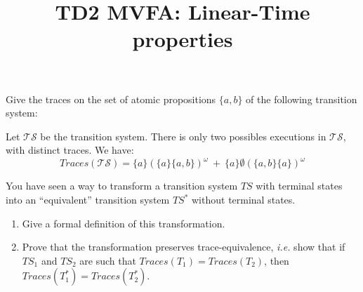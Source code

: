 \documentclass[11pt,a4paper]{article}
\title{TD2 MVFA: Linear-Time properties} %
\date{}
\def\ts{\mathcal{TS}}
\def\traces{\mathit{Traces}}
\def\seta{\{a\}}
\def\setab{\{a,b\}}
\begin{document}
\maketitle

\begin{Exercise}

Give the traces on the set of atomic propositions $\{a,b\}$ of the following transition system:

\begin{center}
\end{center}
\end{Exercise}

\begin{Answer}

Let $\ts$ be the transition system. There is only two possibles executions in $\ts$, with distinct traces.%
We have:
$$\traces(\ts)=\seta{(\seta\setab)}^\omega\ +\ \seta\emptyset{(\setab\seta)}^\omega$$
\end{Answer}

\begin{Exercise}

You have seen a way to transform a transition system $TS$ with terminal states into an ``equivalent'' transition system $TS^*$ without terminal states.

\begin{enumerate}
	\item Give a formal definition of this transformation.
	\item Prove that the transformation preserves trace-equivalence, \textit{i.e.} show that if $TS_1$ and $TS_2$ are such that $Traces(T_1) = Traces(T_2)$, then $Traces(T_1^*) = Traces(T_2^*)$.
\end{enumerate}
\end{Exercise}
\end{document}
